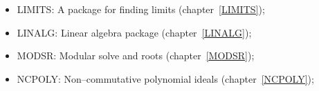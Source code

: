 \begin{itemize}
\item
{LIMITS: A package for finding limits} (chapter~\ref{LIMITS});

\item
{LINALG: Linear algebra package} (chapter~\ref{LINALG});

\item
{MODSR: Modular solve and roots} (chapter~\ref{MODSR});

\item
{NCPOLY: Non--commutative polynomial ideals}
(chapter~\ref{NCPOLY}); 


\end{itemize}
